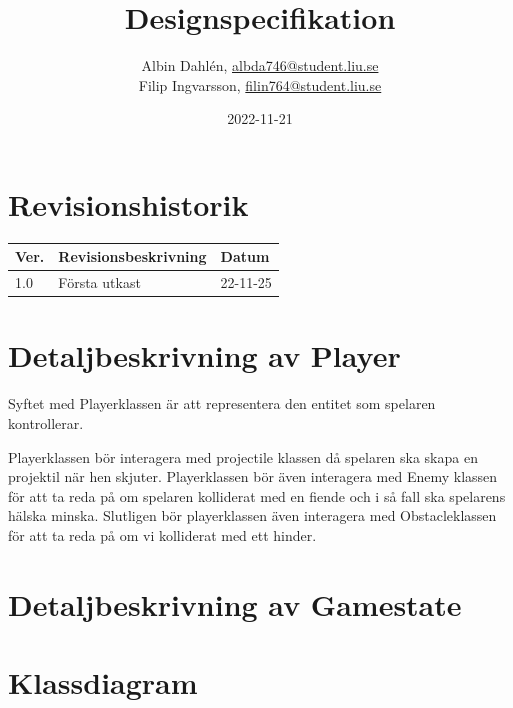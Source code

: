 \documentclass{TDP005mall}
\author{Albin Dahlén, \url{albda746@student.liu.se}\\
  Filip Ingvarsson, \url{filin764@student.liu.se}}
\title{Designspecifikation}
\date{2022-11-21}
\begin{document}
\projectpage
\section{Revisionshistorik}
\begin{table}[!h]
\begin{tabularx}{\linewidth}{|l|X|l|}
\hline
Ver. & Revisionsbeskrivning & Datum \\\hline
1.0 & Första utkast & 22-11-25 \\\hline
\end{tabularx}
\end{table}

\section{Detaljbeskrivning av Player}
Syftet med Playerklassen är att representera den entitet som spelaren kontrollerar.

Playerklassen bör interagera med projectile klassen då spelaren ska skapa en projektil när hen skjuter.
Playerklassen bör även interagera med Enemy klassen för att ta reda på om spelaren kolliderat med en fiende och i så fall ska spelarens hälska minska.
Slutligen bör playerklassen även interagera med Obstacleklassen för att ta reda på om vi kolliderat med ett hinder.

\section{Detaljbeskrivning av Gamestate}

\section{Klassdiagram}
\end{document}
